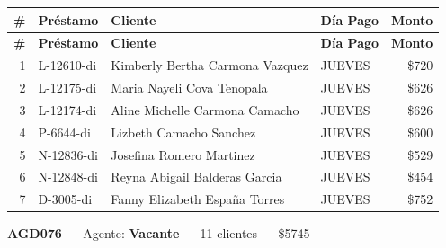\documentclass[11pt,a4paper]{article}
\newcommand{\money}[1]{\$\num{#1}}
\begin{document}
\begin{center}
\renewcommand{\arraystretch}{1.1}
\footnotesize
\begin{longtable}{rlp{6.5cm}lr}
\toprule
\textbf{\#} & \textbf{Pr\'estamo} & \textbf{Cliente} & \textbf{D\'ia Pago} & \textbf{Monto} \\
\midrule
\endfirsthead
\toprule
\textbf{\#} & \textbf{Pr\'estamo} & \textbf{Cliente} & \textbf{D\'ia Pago} & \textbf{Monto} \\
\midrule
\endhead
1 & L-12610-di & Kimberly Bertha Carmona Vazquez & JUEVES & \money{720} \\
2 & L-12175-di & Maria Nayeli Cova Tenopala & JUEVES & \money{626} \\
3 & L-12174-di & Aline Michelle Carmona Camacho & JUEVES & \money{626} \\
4 & P-6644-di & Lizbeth Camacho Sanchez & JUEVES & \money{600} \\
5 & N-12836-di & Josefina Romero Martinez & JUEVES & \money{529} \\
6 & N-12848-di & Reyna Abigail Balderas Garcia & JUEVES & \money{454} \\
7 & D-3005-di & Fanny Elizabeth España Torres & JUEVES & \money{752} \\

\bottomrule
\end{longtable}
\end{center}
\noindent\textbf{AGD076} --- Agente: \textbf{Vacante} --- 11 clientes --- \money{5745}
\end{document}
